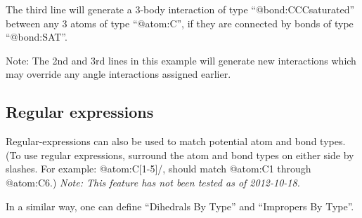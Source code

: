 \documentclass[11pt]{article}
\begin{document}
The third line will generate a 3-body interaction of
type \mbox{``@bond:CCCsaturated''}
between any 3 atoms of type \mbox{``@atom:C''},
if they are connected by bonds of type \mbox{``@bond:SAT''}.

Note: The 2nd and 3rd lines in this example will generate new interactions 
which may override any angle interactions assigned earlier.

\subsection*{Regular expressions}
Regular-expressions can also be used to match potential atom and bond types.
(To use regular expressions, surround the atom and 
bond types on either side by slashes.  
For example: \mbox{@atom:C[1-5]/}, should match 
\mbox{@atom:C1} through \mbox{@atom:C6}.)
\textit{Note: This feature has not been tested as of 2012-10-18.}

In a similar way, one can define ``Dihedrals By Type'' and 
``Impropers By Type''.


\end{document}
